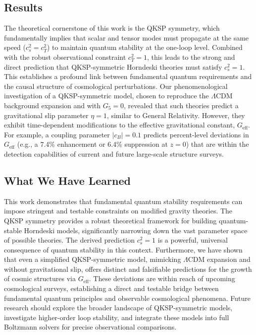 \documentclass[twocolumn]{aastex631}
\begin{document}
\subsection{Results}
The theoretical cornerstone of this work is the QKSP symmetry, which fundamentally implies that scalar and tensor modes must propagate at the same speed ($c_s^2 = c_T^2$) to maintain quantum stability at the one-loop level. Combined with the robust observational constraint $c_T^2=1$, this leads to the strong and direct prediction that QKSP-symmetric Horndeski theories must satisfy $c_s^2=1$. This establishes a profound link between fundamental quantum requirements and the causal structure of cosmological perturbations. Our phenomenological investigation of a QKSP-symmetric model, chosen to reproduce the $\Lambda$CDM background expansion and with $G_5=0$, revealed that such theories predict a gravitational slip parameter $\eta=1$, similar to General Relativity. However, they exhibit time-dependent modifications to the effective gravitational constant, $G_{\text{eff}}$. For example, a coupling parameter $|c_B|=0.1$ predicts percent-level deviations in $G_{\text{eff}}$ (e.g., a 7.4\% enhancement or 6.4\% suppression at $z=0$) that are within the detection capabilities of current and future large-scale structure surveys.

\subsection{What We Have Learned}
This work demonstrates that fundamental quantum stability requirements can impose stringent and testable constraints on modified gravity theories. The QKSP symmetry provides a robust theoretical framework for building quantum-stable Horndeski models, significantly narrowing down the vast parameter space of possible theories. The derived prediction $c_s^2=1$ is a powerful, universal consequence of quantum stability in this context. Furthermore, we have shown that even a simplified QKSP-symmetric model, mimicking $\Lambda$CDM expansion and without gravitational slip, offers distinct and falsifiable predictions for the growth of cosmic structures via $G_{\text{eff}}$. These deviations are within reach of upcoming cosmological surveys, establishing a direct and testable bridge between fundamental quantum principles and observable cosmological phenomena. Future research should explore the broader landscape of QKSP-symmetric models, investigate higher-order loop stability, and integrate these models into full Boltzmann solvers for precise observational comparisons.
\end{document}
